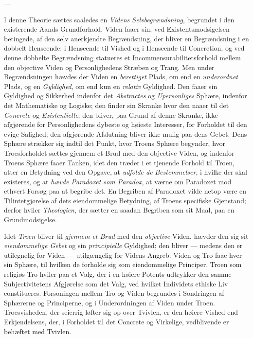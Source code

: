 \documentclass[12pt,a4paper]{book}
\newcommand{\opage}[1]{\marginnote{\footnotesize\textit{[#1]}}}
\begin{document}
\begin{center}---\end{center}

I denne Theorie sættes saaledes en \emph{Videns Selvbegrændsning}, begrundet i
den existerende Aands Grundforhold. Viden faaer sin, ved
Existentsmodsigelsen betingede, af den selv anerkjendte Begrændsning,
der bliver en Begrændsning i en dobbelt Henseende: i Henseende til
Vished og i Henseende til Concretion, og ved denne dobbelte
Begrændsning statueres et Incommensurabilitetsforhold mellem den
objective Viden og Personlighedens Stræben og Trang. Men under
Begrændsningen hævdes der Viden en \emph{berettiget} Plads, om end en \emph{underordnet} Plads, og en \emph{Gyldighed}, om end kun en \emph{relativ} Gyldighed.
Den faaer sin Gyldighed og Sikkerhed indenfor det \emph{Abstractes} og \emph{Upersonliges} Sphære, indenfor det Mathematiske og Logiske; den finder
sin Skranke hvor den naaer til det \emph{Concrete} og \emph{Existentielle}; den
bliver, paa Grund af denne Skranke, ikke afgjørende for Personlighedens
dybeste og høieste Interesser, for Forholdet til den evige Salighed;
den afgjørende Afslutning bliver ikke mulig paa dens Gebet. Dens
Sphære strækker sig indtil det Punkt, hvor Troens Sphære begynder,
hvor Troesforholdet sættes gjennem et Brud med den objective Viden, og
indenfor Troens Sphære faaer Tanken, idet den træder i et tjenende
Forhold til Troen, atter en Betydning ved den Opgave, at \emph{udfolde de} \emph{Be\opage{123}stemmelser}, i hvilke der skal existeres, og at \emph{hævde Paradoxet som Paradox}, at værne om Paradoxet mod ethvert Forsøg
paa at begribe det. En Begriben af Paradoxet vilde netop være en
Tilintetgjørelse af dets eiendommelige Betydning, af Troens specifiske
Gjenstand; derfor hviler \emph{Theologien}, der sætter en saadan Begriben
som sit Maal, paa en Grundmodsigelse.

Idet \emph{Troen} bliver til \emph{gjennem et Brud} med den \emph{objective} Viden, hævder den sig sit \emph{eiendommelige Gebet} og sin \emph{principielle} Gyldighed; den
bliver --- medens den er utilegnelig for Viden --- utilgængelig for
Videns Angreb. Viden og Tro faae hver sin Sphære, til hvilken de
forholde sig som eiendommelige Principer. Troen som religiøs Tro
hviler paa et Valg, der i en høiere Potents udtrykker den samme
Subjectivitetens Afgjørelse som det Valg, ved hvilket Individets
ethiske Liv constitueres. Forsoningen mellem Tro og Viden begrundes i
Sondringen af Sphærerne og Principerne, og i Underordningen af Viden
under Troen. Troesvisheden, der seierrig løfter sig op over Tvivlen,
er den høiere Vished end Erkjendelsens, der, i Forholdet til det
Concrete og Virkelige, vedblivende er behæftet med Tvivlen.
\end{document}
